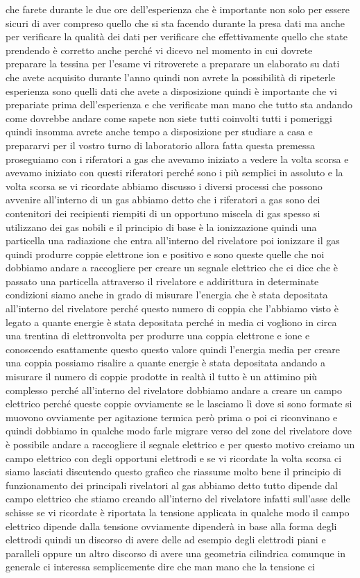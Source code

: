 {che farete durante le due ore dell'esperienza che è importante non solo per essere sicuri di aver compreso quello che si sta facendo durante la presa dati ma anche per verificare la qualità dei dati per verificare che effettivamente quello che state prendendo è corretto anche perché vi dicevo nel momento in cui dovrete preparare la tessina per l'esame vi ritroverete a preparare un elaborato su dati che avete acquisito durante l'anno quindi non avrete la possibilità di ripeterle esperienza sono quelli dati che avete a disposizione quindi è importante che vi prepariate prima dell'esperienza e che verificate man mano che tutto sta andando come dovrebbe andare come sapete non siete tutti coinvolti tutti i pomeriggi quindi insomma avrete anche tempo a disposizione per studiare a casa e prepararvi per il vostro turno di laboratorio allora fatta questa premessa proseguiamo con i riferatori a gas che avevamo iniziato a vedere la volta scorsa e avevamo iniziato con questi riferatori perché sono i più semplici in assoluto e la volta scorsa se vi ricordate abbiamo discusso i diversi processi che possono avvenire all'interno di un gas abbiamo detto che i riferatori a gas sono dei contenitori dei recipienti riempiti di un opportuno miscela di gas spesso si utilizzano dei gas nobili e il principio di base è la ionizzazione quindi una particella una radiazione che entra all'interno del rivelatore poi ionizzare il gas quindi produrre coppie elettrone ion e positivo e sono queste quelle che noi dobbiamo andare a raccogliere per creare un segnale elettrico che ci dice che è passato una particella attraverso il rivelatore e addirittura in determinate condizioni siamo anche in grado di misurare l'energia che è stata depositata all'interno del rivelatore perché questo numero di coppia che l'abbiamo visto è legato a quante energie è stata depositata perché in media ci vogliono in circa una trentina di elettronvolta per produrre una coppia elettrone e ione e conoscendo esattamente questo questo valore quindi l'energia media per creare una coppia possiamo risalire a quante energie è stata depositata andando a misurare il numero di coppie prodotte in realtà il tutto è un attimino più complesso perché all'interno del rivelatore dobbiamo andare a creare un campo elettrico perché queste coppie ovviamente se le lasciamo lì dove si sono formate si muovono ovviamente per agitazione termica però prima o poi ci riconvinano e quindi dobbiamo in qualche modo farle migrare verso del zone del rivelatore dove è possibile andare a raccogliere il segnale elettrico e per questo motivo creiamo un campo elettrico con degli opportuni elettrodi e se vi ricordate la volta scorsa ci siamo lasciati discutendo questo grafico che riassume molto bene il principio di funzionamento dei principali rivelatori al gas abbiamo detto tutto dipende dal campo elettrico che stiamo creando all'interno del rivelatore infatti sull'asse delle schisse se vi ricordate è riportata la tensione applicata in qualche modo il campo elettrico dipende dalla tensione ovviamente dipenderà in base alla forma degli elettrodi quindi un discorso di avere delle ad esempio degli elettrodi piani e paralleli oppure un altro discorso di avere una geometria cilindrica comunque in generale ci interessa semplicemente dire che man mano che la tensione ci }

